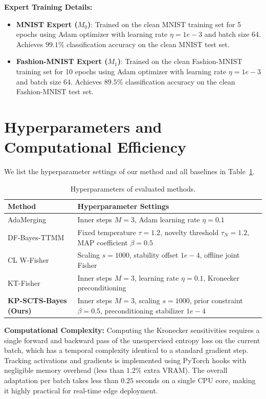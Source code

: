 \documentclass{article}
\theoremstyle{plain}
\theoremstyle{definition}
\theoremstyle{remark}
\begin{document}
\textbf{Expert Training Details:}
\begin{itemize}
    \item \textbf{MNIST Expert ($M_0$)}: Trained on the clean MNIST training set for 5 epochs using Adam optimizer with learning rate $\eta = 1e-3$ and batch size 64. Achieves $99.1\%$ classification accuracy on the clean MNIST test set.
    \item \textbf{Fashion-MNIST Expert ($M_1$)}: Trained on the clean Fashion-MNIST training set for 10 epochs using Adam optimizer with learning rate $\eta = 1e-3$ and batch size 64. Achieves $89.5\%$ classification accuracy on the clean Fashion-MNIST test set.
\end{itemize}

\section{Hyperparameters and Computational Efficiency}
\label{appendix:hyperparameters}
We list the hyperparameter settings of our method and all baselines in Table~\ref{tab:hyperparams}.

\begin{table}[h]
\centering
\caption{Hyperparameters of evaluated methods.}
\label{tab:hyperparams}
\vskip 0.15in
\begin{tabular}{lp{11cm}}
\toprule
Method & Hyperparameter Settings \\
\midrule
AdaMerging & Inner steps $M=3$, Adam learning rate $\eta=0.1$ \\
DF-Bayes-TTMM & Fixed temperature $\tau=1.2$, novelty threshold $\tau_N=1.2$, MAP coefficient $\beta=0.5$ \\
CL W-Fisher & Scaling $s=1000$, stability offset $1e-4$, offline joint Fisher \\
KT-Fisher & Inner steps $M=3$, learning rate $\eta=0.1$, Kronecker preconditioning \\
\midrule
\textbf{KP-SCTS-Bayes (Ours)} & Inner steps $M=3$, scaling $s=1000$, prior constraint $\beta=0.5$, preconditioning stabilizer $1e-4$ \\
\bottomrule
\end{tabular}
\end{table}

\textbf{Computational Complexity:}
Computing the Kronecker sensitivities requires a single forward and backward pass of the unsupervised entropy loss on the current batch, which has a temporal complexity identical to a standard gradient step. Tracking activations and gradients is implemented using PyTorch hooks with negligible memory overhead (less than $1.2\%$ extra VRAM). The overall adaptation per batch takes less than $0.25$ seconds on a single CPU core, making it highly practical for real-time edge deployment.
\end{document}
